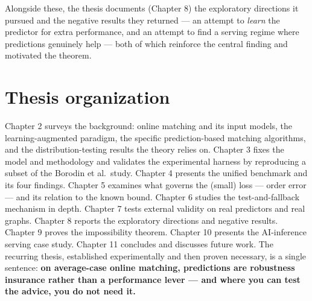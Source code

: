 Alongside these, the thesis documents (Chapter 8) the exploratory directions it pursued and
the negative results they returned --- an attempt to \emph{learn} the predictor for extra
performance, and an attempt to find a serving regime where predictions genuinely help ---
both of which reinforce the central finding and motivated the theorem.

\section{Thesis organization}\label{thesis-organization}

Chapter 2 surveys the background: online matching and its input models, the
learning-augmented paradigm, the specific prediction-based matching algorithms, and the
distribution-testing results the theory relies on. Chapter 3 fixes the model and
methodology and validates the experimental harness by reproducing a subset of the Borodin et
al.~study. Chapter 4 presents the unified benchmark and its four findings. Chapter 5
examines what governs the (small) loss --- order error --- and its relation to the known bound.
Chapter 6 studies the test-and-fallback mechanism in depth. Chapter 7 tests external
validity on real predictors and real graphs. Chapter 8 reports the exploratory directions
and negative results. Chapter 9 proves the impossibility theorem. Chapter 10 presents the
AI-inference serving case study. Chapter 11 concludes and discusses future work. The
recurring thesis, established experimentally and then proven necessary, is a single
sentence: \textbf{on average-case online matching, predictions are robustness insurance rather
than a performance lever --- and where you can test the advice, you do not need it.}
